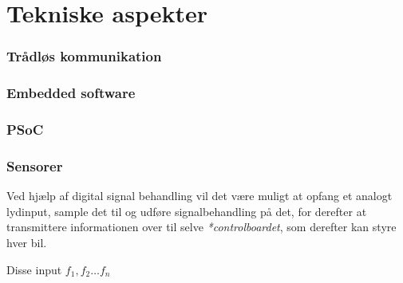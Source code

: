 \section{Tekniske aspekter}
\subsubsection{Trådløs kommunikation}
\subsubsection{Embedded software}
\subsubsection{PSoC}
\subsubsection{Sensorer}
Ved hjælp af digital signal behandling vil det være muligt at opfang et analogt lydinput, sample det til og udføre signalbehandling på det, for derefter at transmittere informationen over til selve \emph{*controlboardet}, som derefter kan styre hver bil.  

Disse input \(f_1, f_2 \dots f_n\)
